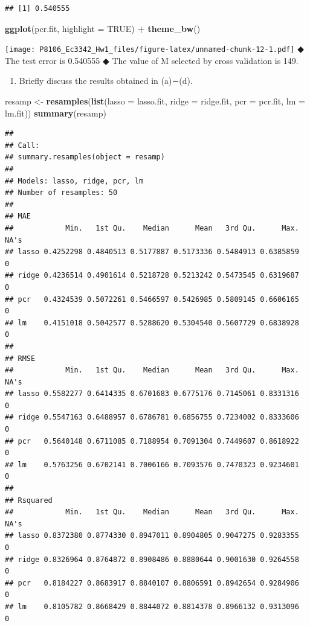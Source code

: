 \documentclass[]{article}
\newenvironment{Shaded}{\begin{snugshade}}{\end{snugshade}}
\newcommand{\DataTypeTok}[1]{\textcolor[rgb]{0.13,0.29,0.53}{#1}}
\newcommand{\KeywordTok}[1]{\textcolor[rgb]{0.13,0.29,0.53}{\textbf{#1}}}
\newcommand{\NormalTok}[1]{#1}
\newcommand{\OperatorTok}[1]{\textcolor[rgb]{0.81,0.36,0.00}{\textbf{#1}}}
\newcommand{\OtherTok}[1]{\textcolor[rgb]{0.56,0.35,0.01}{#1}}
\newcommand{\StringTok}[1]{\textcolor[rgb]{0.31,0.60,0.02}{#1}}
\providecommand{\tightlist}{%
  \setlength{\itemsep}{0pt}\setlength{\parskip}{0pt}}
\begin{document}
\begin{verbatim}
## [1] 0.540555
\end{verbatim}

\begin{Shaded}
\begin{Highlighting}[]
\KeywordTok{ggplot}\NormalTok{(pcr.fit, }\DataTypeTok{highlight =} \OtherTok{TRUE}\NormalTok{) }\OperatorTok{+}\StringTok{ }\KeywordTok{theme_bw}\NormalTok{()}
\end{Highlighting}
\end{Shaded}

\texttt{[image: P8106\_Ec3342\_Hw1\_files/figure-latex/unnamed-chunk-12-1.pdf]}
◆ The test error is 0.540555 ◆ The value of M selected by cross
validation is 149.

\begin{enumerate}
\def\labelenumi{\alph{enumi})}
\setcounter{enumi}{4}
\tightlist
\item
  Briefly discuss the results obtained in (a)∼(d).
\end{enumerate}

\begin{Shaded}
\begin{Highlighting}[]
\NormalTok{resamp <-}\StringTok{ }\KeywordTok{resamples}\NormalTok{(}\KeywordTok{list}\NormalTok{(}\DataTypeTok{lasso =}\NormalTok{ lasso.fit, }\DataTypeTok{ridge =}\NormalTok{ ridge.fit, }\DataTypeTok{pcr =}\NormalTok{ pcr.fit, }\DataTypeTok{lm =}\NormalTok{ lm.fit))}
\KeywordTok{summary}\NormalTok{(resamp)}
\end{Highlighting}
\end{Shaded}

\begin{verbatim}
## 
## Call:
## summary.resamples(object = resamp)
## 
## Models: lasso, ridge, pcr, lm 
## Number of resamples: 50 
## 
## MAE 
##            Min.   1st Qu.    Median      Mean   3rd Qu.      Max. NA's
## lasso 0.4252298 0.4840513 0.5177887 0.5173336 0.5484913 0.6385859    0
## ridge 0.4236514 0.4901614 0.5218728 0.5213242 0.5473545 0.6319687    0
## pcr   0.4324539 0.5072261 0.5466597 0.5426985 0.5809145 0.6606165    0
## lm    0.4151018 0.5042577 0.5288620 0.5304540 0.5607729 0.6838928    0
## 
## RMSE 
##            Min.   1st Qu.    Median      Mean   3rd Qu.      Max. NA's
## lasso 0.5582277 0.6414335 0.6701683 0.6775176 0.7145061 0.8331316    0
## ridge 0.5547163 0.6488957 0.6786781 0.6856755 0.7234002 0.8333606    0
## pcr   0.5640148 0.6711085 0.7188954 0.7091304 0.7449607 0.8618922    0
## lm    0.5763256 0.6702141 0.7006166 0.7093576 0.7470323 0.9234601    0
## 
## Rsquared 
##            Min.   1st Qu.    Median      Mean   3rd Qu.      Max. NA's
## lasso 0.8372380 0.8774330 0.8947011 0.8904805 0.9047275 0.9283355    0
## ridge 0.8326964 0.8764872 0.8908486 0.8880644 0.9001630 0.9264558    0
## pcr   0.8184227 0.8683917 0.8840107 0.8806591 0.8942654 0.9284906    0
## lm    0.8105782 0.8668429 0.8844072 0.8814378 0.8966132 0.9313096    0
\end{verbatim}
\end{document}
